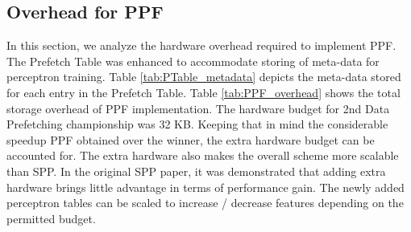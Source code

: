 \subsection{Overhead for PPF}
\label{Method-Overheads}
In this section, we analyze the hardware overhead required to
implement PPF. The Prefetch Table was enhanced to accommodate storing
of meta-data for perceptron training. Table \ref{tab:PTable_metadata}
depicts the meta-data stored for each entry in the Prefetch Table.
Table \ref{tab:PPF_overhead} shows the total storage overhead of PPF
implementation. The hardware budget for 2nd Data Prefetching
championship was 32 KB.  Keeping that in mind the considerable speedup
PPF obtained over the winner, the extra hardware budget can be
accounted for. The extra hardware also makes the overall scheme more
scalable than SPP. In the original SPP paper, it was demonstrated that
adding extra hardware brings little advantage in terms of performance
gain. The newly added perceptron tables can be scaled to increase /
decrease features depending on the permitted budget.


